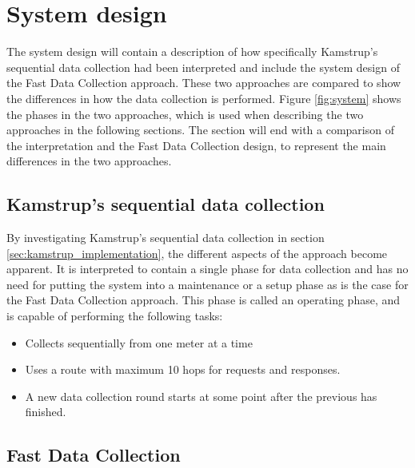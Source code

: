 \section{System design}
\label{sec:system_design}


% 



The system design will contain a description of how specifically Kamstrup's sequential data collection had been interpreted and include the system design of the Fast Data Collection approach. These two approaches are compared to show the differences in how the data collection is performed. Figure \ref{fig:system} shows the phases in the two approaches, which is used when describing the two approaches in the following sections. The section will end with a comparison of the interpretation and the Fast Data Collection design, to represent the main differences in the two approaches.


\subsection{Kamstrup's sequential data collection}
\label{sec:system_design:kamstrup}

By investigating Kamstrup's sequential data collection in section \ref{sec:kamstrup_implementation}, the different aspects of the approach become apparent. It is interpreted to contain a single phase for data collection and has no need for putting the system into a maintenance or a setup phase as is the case for the Fast Data Collection approach. This phase is called an operating phase, and is capable of performing the following tasks:
\begin{itemize}
\item Collects sequentially from one meter at a time
\item Uses a route with maximum 10 hops for requests and responses.
\item A new data collection round starts at some point after the previous has finished.
\end{itemize}

\subsection{Fast Data Collection}
\label{sec:system_design:fdc}

